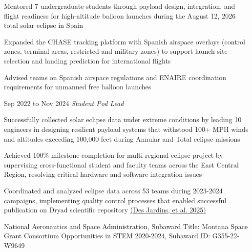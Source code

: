     \vspace{0.10 cm}
    \begin{onecolentry}
        \begin{highlights}
            \item Mentored 7 undergraduate students through payload design, integration, and flight readiness for high-altitude balloon launches during the August 12, 2026 total solar eclipse in Spain
    		\item Expanded the CHASE tracking platform with Spanish airspace overlays (control zones, terminal areas, restricted and military zones) to support launch site selection and landing prediction for international flights
    		\item Advised teams on Spanish airspace regulations and ENAIRE coordination requirements for unmanned free balloon launches
        \end{highlights}
    \end{onecolentry}

    \vspace{0.10 cm}

    \begin{twocolentry}{Sep 2022 to Nov 2024}
        \textit{Student Pod Lead}
    \end{twocolentry}

    \vspace{0.10 cm}
    \begin{onecolentry}
        \begin{highlights}
            \item Successfully collected solar eclipse data under extreme conditions by leading 10 engineers in designing resilient payload systems that withstood 100+ MPH winds and altitudes exceeding 100,000 feet during Annular and Total eclipse missions
            \item Achieved 100\% milestone completion for multi-regional eclipse project by supervising cross-functional student and faculty teams across the East Central Region, resolving critical hardware and software integration issues
            \item Coordinated and analyzed eclipse data across 53 teams during 2023-2024 campaigns, implementing quality control processes that enabled successful publication on Dryad scientific repository \href{https://datadryad.org/dataset/doi:10.5061/dryad.rv15dv4jh}{(Des Jardins, et al. 2025)}
            \item National Aeronautics and Space Administration, Subaward Title: Montana Space Grant Consortium Opportunities in STEM 2020-2024, Subaward ID: G355-22-W9649
        \end{highlights}
    \end{onecolentry}
    
